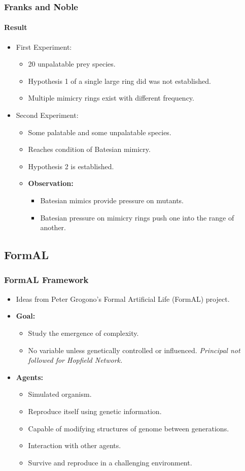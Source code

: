 \frame
{
	\frametitle{Franks and Noble}
	\framesubtitle{Result}

	\begin{itemize}
		\item First Experiment:
			\begin{itemize}
				\item 20 unpalatable prey species.
				\item Hypothesis 1 of a single large ring did was not established.
				\item Multiple mimicry rings exist with different frequency.
			\end{itemize}
		\item Second Experiment:
			\begin{itemize}
				\item Some palatable and some unpalatable species.
				\item Reaches condition of Batesian mimicry. 
				\item Hypothesis 2 is established.
				\item \textbf{Observation:}
					\begin{itemize}
						\item Batesian mimics provide pressure on mutants.
						\item Batesian pressure on mimicry rings push one into the range of another.
					\end{itemize}
			\end{itemize}
	\end{itemize}
}

\subsection{FormAL}

\frame
{
	\frametitle{FormAL Framework}
	
	\begin{itemize}
		\item Ideas from Peter Grogono's Formal Artificial Life (FormAL) project.
		\item \textbf{Goal:}		
			\begin{itemize}
				\item Study the emergence of complexity.
				\item No variable unless genetically controlled or influenced. \textit{Principal not followed for Hopfield Network.}
			\end{itemize}
		\item \textbf{Agents:}
			\begin{itemize}
				\item Simulated organism.
				\item Reproduce itself using genetic information.
				\item Capable of modifying structures of genome between generations.
				\item Interaction with other agents.
				\item Survive and reproduce in a challenging environment.
			\end{itemize}
	\end{itemize}
	
}

